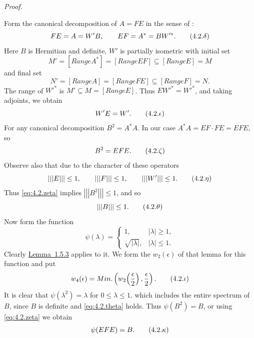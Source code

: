 \documentclass[b5paper,twoside]{article}
\newcommand{\lemref}[2]{\hyperref[#1]{\mbox{Lemma~#2}}}
\theoremstyle{mvnplain}
\renewenvironment{proof}[1][Proof]{%
  \par\addvspace{0.35\baselineskip}%
  \noindent\textit{#1.}\ \normalfont\ignorespaces
}{%
  \par\addvspace{0.35\baselineskip}%
}
\newcommand{\OpNorm}[1]{\left\lvert\left\lvert\left\lvert#1\right\rvert\right\rvert\right\rvert}
\def\operatorname#1{#1}%
\def\mathfrak#1{#1}%
\begin{document}
\begin{proof}
Form the canonical decomposition of \(A=FE\) in the sense of
\cite[p.~143, Definition~4.4.1]{ref5}:
\begin{equation}\label{eq:4.2.delta}
 FE=A=W'B,\qquad EF=A^*=BW'^*.
  \tag{4.2.\ensuremath{\delta}}
\end{equation}
Here \(B\) is Hermitian and definite, \(W'\) is partially isometric with
initial set
\[
  \mathfrak M'=[\operatorname {Range}A^*]
  =[\operatorname {Range}EF]
  \subseteq[\operatorname {Range}E]=\mathfrak M
\]
and final set
\[
  \mathfrak N'=[\operatorname {Range}A]
  =[\operatorname {Range}FE]
  \subseteq[\operatorname {Range}F]=\mathfrak N.
\]
The range of \(W'^*\) is
\(\mathfrak M'\subseteq\mathfrak M=[\operatorname {Range}E]\). Thus
\(EW'^*=W'^*\), and taking adjoints, we obtain
\begin{equation}\label{eq:4.2.epsilon}
  W'E=W'.
  \tag{4.2.\ensuremath{\epsilon}}
\end{equation}
For any canonical decomposition \(B^2=A^*A\). In our case
\(A^*A=EF\cdot FE=EFE\), so
\begin{equation}\label{eq:4.2.zeta}
  B^2=EFE.
  \tag{4.2.\ensuremath{\zeta}}
\end{equation}
Observe also that due to the character of these operators
\begin{equation}\label{eq:4.2.eta}
  \OpNorm{E}\le1,\qquad \OpNorm{F}\le1,\qquad \OpNorm{W'}\le1.
  \tag{4.2.\ensuremath{\eta}}
\end{equation}
Thus \eqref{eq:4.2.zeta} implies \(\OpNorm{B^2}\le1\), and so
\begin{equation}\label{eq:4.2.theta}
  \OpNorm{B}\le1.
  \tag{4.2.\ensuremath{\theta}}
\end{equation}
Now form the function
\[
\psi(\lambda)=
\begin{cases}
1,&|\lambda|\ge1,\\
\sqrt{|\lambda|},&|\lambda|\le1.
\end{cases}
\]
Clearly \lemref{lem:1.5.3}{1.5.3} applies to it. We form the
\(w_2(\epsilon)\) of that lemma for this function and put
\begin{equation}\label{eq:4.2.iota}
  w_4(\epsilon)=\operatorname {Min.}
  \left(w_2\!\left(\frac{\epsilon}{2}\right),\frac{\epsilon}{2}\right).
  \tag{4.2.\ensuremath{\iota}}
\end{equation}
It is clear that \(\psi(\lambda^2)=\lambda\) for \(0\le\lambda\le1\),
which includes the entire spectrum of \(B\), since \(B\) is definite and
\eqref{eq:4.2.theta} holds. Thus \(\psi(B^2)=B\), or using
\eqref{eq:4.2.zeta} we obtain
\begin{equation}\label{eq:4.2.kappa}
  \psi(EFE)=B.
  \tag{4.2.\ensuremath{\kappa}}
\end{equation}


\end{proof}
\end{document}

